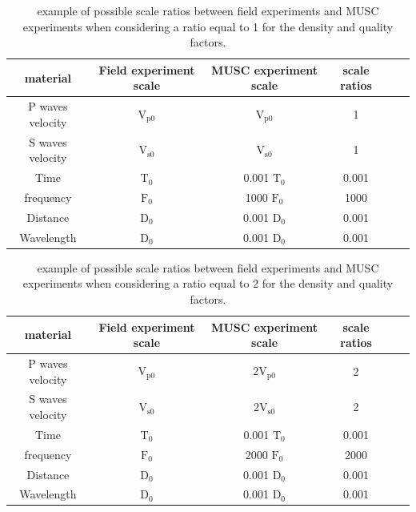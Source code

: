 \documentclass[paper,extra]{gji} %
\begin{document}
\begin{table}[!ht]
\centering
\begin{tabular}{cccccc}
\hline
material & Field experiment scale & MUSC experiment scale & scale ratios \\
\hline
P waves velocity & $\mathrm{V_{p 0}}$ & $\mathrm{V_{p 0}}$ & 1 \\
S waves velocity & $\mathrm{V_{s 0}}$ & $\mathrm{V_{s 0}}$ & 1 \\
Time & $\mathrm{T_{0}}$ & 0.001 $\mathrm{T_{0}}$ & 0.001 \\
frequency & $\mathrm{F_{0}}$ & 1000 $\mathrm{F_{0}}$ & 1000 \\
Distance & $\mathrm{D_{0}}$ & 0.001 $\mathrm{D_{0}}$ & 0.001 \\
Wavelength & $\mathrm{D_{0}}$ & 0.001 $\mathrm{D_{0}}$ & 0.001 \\
\hline
\end{tabular}
\caption{ example of possible scale ratios between field experiments and MUSC experiments when considering a ratio equal to 1 for the density and quality factors.}
\label{epoxy-resin}
\end{table}

\begin{table}[!ht]
\centering
\begin{tabular}{cccccc}
\hline
material & Field experiment scale & MUSC experiment scale & scale ratios \\
\hline
P waves velocity & $\mathrm{V_{p 0}}$ & $\mathrm{2V_{p 0}}$ & 2 \\
S waves velocity & $\mathrm{V_{s 0}}$ & $\mathrm{2V_{s 0}}$ & 2 \\
Time & $\mathrm{T_{0}}$ & 0.001 $\mathrm{T_{0}}$ & 0.001 \\
frequency & $\mathrm{F_{0}}$ & 2000 $\mathrm{F_{0}}$ & 2000 \\
Distance & $\mathrm{D_{0}}$ & 0.001 $\mathrm{D_{0}}$ & 0.001 \\
Wavelength & $\mathrm{D_{0}}$ & 0.001 $\mathrm{D_{0}}$ & 0.001 \\
\hline
\end{tabular}
\caption{ example of possible scale ratios between field experiments and MUSC experiments when considering a ratio equal to 2 for the density and quality factors.}
\label{epoxy-resin}
\end{table}
\end{document}
